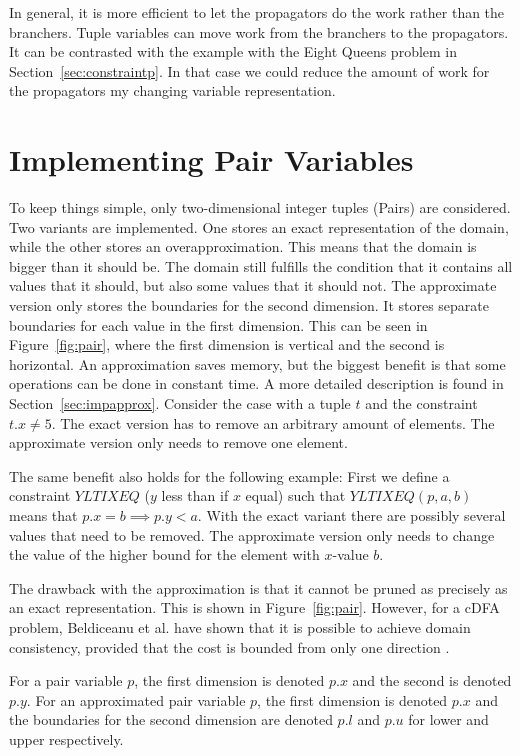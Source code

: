 \documentclass[a4paper,11pt]{article}
\begin{document}
In general, it is more efficient to let the propagators do the work rather than the branchers. Tuple variables can move work from the branchers to the propagators. It can be contrasted with the example with the Eight Queens problem in Section~\ref{sec:constraintp}. In that case we could reduce the amount of work for the propagators my changing variable representation.

\section{Implementing Pair Variables}
To keep things simple, only two-dimensional integer tuples (Pairs) are considered. Two variants are implemented. One stores an exact representation of the domain, while the other stores an overapproximation. This means that the domain is bigger than it should be. The domain still fulfills the condition that it contains all values that it should, but also some values that it should not. The approximate version only stores the boundaries for the second dimension. It stores separate boundaries for each value in the first dimension. This can be seen in Figure~\ref{fig:pair}, where the first dimension is vertical and the second is horizontal. An approximation saves memory, but the biggest benefit is that some operations can be done in constant time. A more detailed description is found in Section~\ref{sec:impapprox}. Consider the case with a tuple $t$ and the constraint $t.x\neq5$. The exact version has to remove an arbitrary amount of elements. The approximate version only needs to remove one element. 

The same benefit also holds for the following example: First we define a constraint $\mathit{YLTIXEQ}$ ($y$ less than if $x$ equal) such that $\mathit{YLTIXEQ}(p, a, b)$ means that $p.x=b\implies p.y<a$. With the exact variant there are possibly several values that need to be removed. The approximate version only needs to change the value of the higher bound for the element with $x$-value $b$.

The drawback with the approximation is that it cannot be pruned as precisely as an exact representation. This is shown in Figure~\ref{fig:pair}. However, for a cDFA problem, Beldiceanu et al. have shown that it is possible to achieve domain consistency, provided that the cost is bounded from only one direction \cite{Beldiceanu675954}.

For a pair variable $p$, the first dimension is denoted $p.x$ and the second is denoted $p.y$. For an approximated pair variable $p$, the first dimension is denoted $p.x$ and the boundaries for the second dimension are denoted $p.l$ and $p.u$ for lower and upper respectively.
\end{document}
